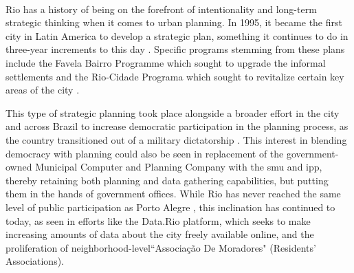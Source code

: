 \paragraph{} \label{sec:rio-plans} \leavevmode\newline

Rio has a history of being on the forefront of intentionality and long-term strategic thinking when it comes to urban planning. In 1995, it became the first city in Latin America to develop a strategic plan, something it continues to do in three-year increments to this day \cite{prefeituradacidadedoriodejaneiroPLANOESTRATEGICOCIDADE2017}. Specific programs stemming from these plans include the Favela Bairro Programme which sought to upgrade the informal settlements and the Rio-Cidade Programa which sought to revitalize certain key areas of the city \cite{aciolyc.ReviewingUrbanRevitalisation2001}.

This type of strategic planning took place alongside a broader effort in the city and across Brazil to increase democratic participation in the planning process, as the country transitioned out of a military dictatorship \cite{aciolyc.ReviewingUrbanRevitalisation2001}. This interest in blending democracy with planning could also be seen in replacement of the government-owned Municipal Computer and Planning Company with the \ac{smu} and \ac{ipp}, thereby retaining both planning and data gathering capabilities, but putting them in the hands of government offices. While Rio has never reached the same level of public participation as Porto Alegre \cite{desousasantosParticipatoryBudgetingPorto1998}, this inclination has continued to today, as seen in efforts like the Data.Rio platform, which seeks to make increasing amounts of data about the city freely available online, and the proliferation of neighborhood-level``Associação De Moradores" (Residents' Associations).

